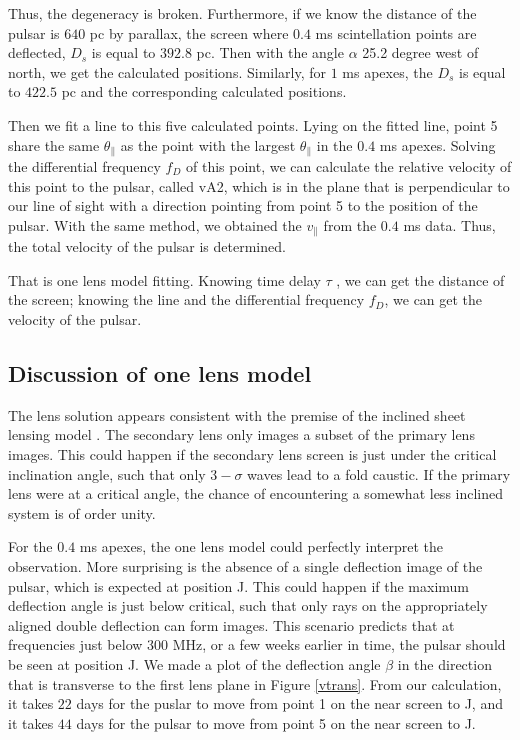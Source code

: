 \documentclass[useAMS,usenatbib]{mn2e}
\begin{document}
Thus, the degeneracy is broken. Furthermore, if we know the distance of the pulsar is $640$ pc by parallax,
the screen where $0.4$ ms scintellation points are deflected, $D_s$ is equal to $392.8$ pc. Then with the angle $\alpha$ 25.2 degree west of north, we get the calculated positions.
Similarly, for $1$ ms apexes, the $D_s$ is equal to $422.5$ pc and the corresponding calculated positions.

Then we fit a line to this five calculated points. Lying on the fitted line, point 5 share the same $\theta_{\parallel}$ as the point with the largest $\theta_{\parallel}$ in the $0.4$ ms apexes. Solving the differential frequency ${f_D}$ of this point, we can calculate the relative velocity of this point to the pulsar, called vA2, which is in the plane that is perpendicular to our line of sight with a direction pointing from point 5 to the position of the pulsar. With the same method, we obtained the $v_{\parallel}$ from the $0.4$ ms data. Thus, the total velocity of the pulsar is determined.

That is one lens model fitting. Knowing time delay ${\tau}$ , we can get the distance of the screen; knowing the line and the differential frequency ${f_D}$, we can get the velocity of the pulsar.
\subsection{Discussion of one lens model}

The lens solution appears consistent with the premise of the inclined
sheet lensing model \citep{2014MNRAS.442.3338P}.  The secondary lens
only images a subset of the primary lens images.  This could happen if
the secondary lens screen is just under the critical inclination
angle, such that only $3-\sigma$ waves lead to a fold caustic.  If the
primary lens were at a critical angle, the chance of encountering a
somewhat less inclined system is of order unity.

For the $0.4$ ms apexes, the one lens model could perfectly interpret the observation. More surprising is the absence of a single deflection image of the
pulsar, which is expected at position J.  This could happen if the
maximum deflection angle is just below critical, such that only rays
on the appropriately aligned double deflection can form images.  This
scenario predicts that at frequencies just below $300$ MHz, or a few
weeks earlier in time, the pulsar should be seen at position J. We made a plot of the deflection angle $\beta$ in the direction that is transverse to the first lens plane in Figure \ref{vtrans}.
From our calculation, it takes $22$ days for the puslar to move from point 1 on the near screen to J, and it takes $44$ days for the pulsar to move from point 5 on the near screen to J.
\end{document}
